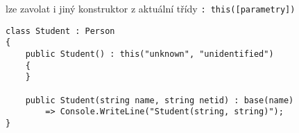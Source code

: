 \begin{frame}[fragile]
\begin{bitemize}{}
\item lze zavolat i jiný konstruktor z aktuální třídy \lstinline|: this([parametry])|
\end{bitemize}

\begin{yesblock}
\begin{lstlisting}[basicstyle=\small]
class Student : Person
{
    public Student() : this("unknown", "unidentified") 
    { 
    }

    public Student(string name, string netid) : base(name) 
        => Console.WriteLine("Student(string, string)");
}
\end{lstlisting}
\end{yesblock}
\end{frame}